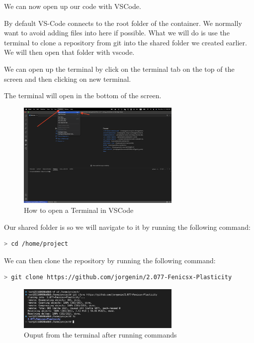 \documentclass[final]{article}
\numberwithin{equation}{section}
\theoremstyle{remarkStyle}
\begin{document}
We can now open up our code with VSCode.

By default VS-Code connects to the root folder of the container. We normally want to avoid adding files into here if possible.
What we will do is use the terminal to clone a repository from git into the shared folder we created earlier.
We will then open that folder with vscode.

We can open up the terminal by click on the terminal tab on the top of the screen and then clicking on new terminal.

The terminal will open in the bottom of the screen.

\begin{figure}[H]
  \centering
  \includegraphics[width=0.7\textwidth]{Terminal-Open.png}
  \caption{How to open a Terminal in VSCode }%
  \label{fig:vsDocker-Terminal}%
\end{figure}


Our shared folder is  so we will navigate to it by running the following command:
\begin{lstlisting}[language=bash, caption=Docker Pull Command]
  > cd /home/project
\end{lstlisting}

We can then clone the repository by running the following command:
\begin{lstlisting}[language=bash, caption=Docker Pull Command]
  > git clone https://github.com/jorgenin/2.077-Fenicsx-Plasticity
\end{lstlisting}


\begin{figure}[H]
  \centering
  \includegraphics[width=0.7\textwidth]{terminal_output.png}
  \caption{Ouput from the terminal after running commands }%
  \label{fig:vsDocker-Terminal_ouput}%
\end{figure}
\end{document}
